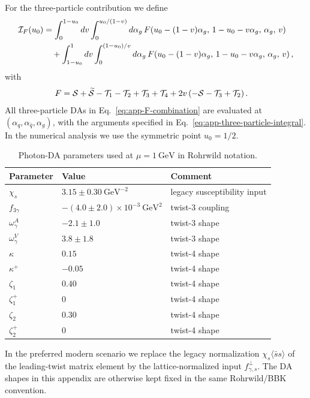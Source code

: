 \documentclass[aps,prd,preprint,nofootinbib,superscriptaddress]{revtex4-2}
\newcommand{\GeV}{\mathrm{GeV}}
\begin{document}
For the three-particle contribution we define
\begin{align}
  {\cal I}_{F}(u_0)
  &=
  \int_0^{1-u_0}dv
  \int_0^{u_0/(1-v)}d\alpha_g\,
  F\!\left(
  u_0-(1-v)\alpha_g,\,
  1-u_0-v\alpha_g,\,
  \alpha_g,\,
  v
  \right)
  \notag\\
  &\quad
  +\int_{1-u_0}^{1}dv
  \int_0^{(1-u_0)/v}d\alpha_g\,
  F\!\left(
  u_0-(1-v)\alpha_g,\,
  1-u_0-v\alpha_g,\,
  \alpha_g,\,
  v
  \right),
  \label{eq:app-three-particle-integral}
\end{align}
with
\begin{align}
  F
  &=
  {\cal S}
  +\widetilde{\cal S}
  -{\cal T}_1
  -{\cal T}_2
  +{\cal T}_3
  +{\cal T}_4
  +2v\left(-{\cal S}-{\cal T}_3+{\cal T}_2\right).
  \label{eq:app-F-combination}
\end{align}
All three-particle DAs in Eq.~\eqref{eq:app-F-combination} are evaluated at
\((\alpha_q,\alpha_{\bar q},\alpha_g)\), with the arguments specified in
Eq.~\eqref{eq:app-three-particle-integral}.  In the numerical analysis we use
the symmetric point \(u_0=1/2\).

\begin{table}[t]
\caption{Photon-DA parameters used at $\mu=1~\GeV$ in Rohrwild notation.}
\label{tab:app-photon-params}
\begin{ruledtabular}
\begin{tabular}{lll}
Parameter & Value & Comment\\
\hline
$\chi_s$ & $3.15\pm0.30~\GeV^{-2}$ & legacy susceptibility input\\
$f_{3\gamma}$ & $-(4.0\pm2.0)\times10^{-3}~\GeV^2$ & twist-3 coupling\\
$\omega_\gamma^A$ & $-2.1\pm1.0$ & twist-3 shape\\
$\omega_\gamma^V$ & $3.8\pm1.8$ & twist-3 shape\\
$\kappa$ & $0.15$ & twist-4 shape\\
$\kappa^+$ & $-0.05$ & twist-4 shape\\
$\zeta_1$ & $0.40$ & twist-4 shape\\
$\zeta_1^+$ & $0$ & twist-4 shape\\
$\zeta_2$ & $0.30$ & twist-4 shape\\
$\zeta_2^+$ & $0$ & twist-4 shape\\
\end{tabular}
\end{ruledtabular}
\end{table}

In the preferred modern scenario we replace the legacy normalization
$\chi_s\langle\bar s s\rangle$ of the leading-twist matrix element by the
lattice-normalized input $f_{\gamma,s}^{\perp}$.  The DA shapes in this
appendix are otherwise kept fixed in the same Rohrwild/BBK convention.
\end{document}
